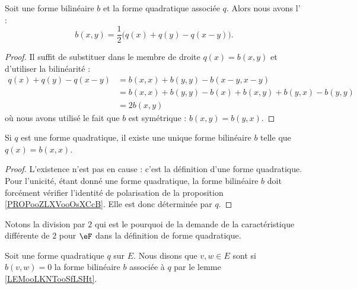 \begin{proposition} \label{PROPooZLXVooOsXCcB}
	Soit une forme bilinéaire \( b\) et la forme quadratique associée \( q\). Alors nous avons l' :
	\begin{equation}    \label{EqMrbsop}
		b(x,y)=\frac{ 1 }{2}\big( q(x)+q(y)-q(x-y) \big).
	\end{equation}
\end{proposition}

\begin{proof}
	Il suffit de substituer dans le membre de droite \( q(x)=b(x,y)\) et d'utiliser la bilinéarité :
	\begin{subequations}
		\begin{align}
			q(x)+q(y)-q(x-y) & =b(x,x)+b(y,y)-b(x-y,x-y)                \\
			                 & =b(x,x)+b(y,y)-b(x)+b(x,y)+b(y,x)-b(y,y) \\
			                 & =2b(x,y)
		\end{align}
	\end{subequations}
	où nous avons utilisé le fait que \( b\) est symétrique : \( b(x,y)=b(y,x)\).
\end{proof}

\begin{lemma}       \label{LEMooLKNTooSfLSHt}
	Si \( q\) est une forme quadratique, il existe une unique forme bilinéaire \( b\) telle que \( q(x)=b(x,x)\).
\end{lemma}

\begin{proof}
	L'existence n'est pas en cause : c'est la définition d'une forme quadratique. Pour l'unicité, étant donné une forme quadratique, la forme bilinéaire \( b\) doit forcément vérifier l'identité de polarisation de la proposition \ref{PROPooZLXVooOsXCcB}. Elle est donc déterminée par \( q\).
\end{proof}
Notons la division par \( 2\) qui est le pourquoi de la demande de la caractéristique différente de \( 2\) pour \( \eF\) dans la définition de forme quadratique.

\begin{definition}      \label{DEFooGECOooCCGVXG}
	Soit une forme quadratique \( q\) sur \( E\). Nous disons que \( v,w\in E\) sont  si \( b(v,w)=0\) la forme bilinéaire \( b\) associée à \( q\) par le lemme \ref{LEMooLKNTooSfLSHt}.
\end{definition}


